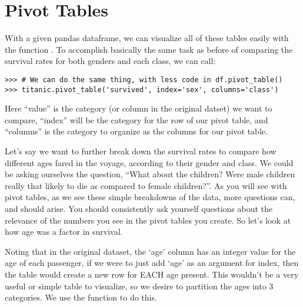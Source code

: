 \section*{Pivot Tables}
With a given pandas dataframe, we can visualize all of these tables easily with the function . To accomplish basically the same task as before of comparing the survival rates for both genders and each class, we can call:

\begin{lstlisting}
>>> # We can do the same thing, with less code in df.pivot_table()
>>> titanic.pivot_table('survived', index='sex', columns='class')
\end{lstlisting}


Here ``value'' is the category (or column in the original datset) we want to compare, ``index'' will be the category for the row of our pivot table, and ``columns'' is the category to organize as the columns for our pivot table.

Let's say we want to further break down the survival rates to compare how different ages fared in the voyage, according to their gender and class. We could be asking ourselves the question, ``What about the children? Were male children really that likely to die as compared to female children?''. As you will see with pivot tables, as we see these simple breakdowns of the data, more questions can, and should arise. You should consistently ask yourself questions about the relevance of the numbers you see in the pivot tables you create. So let's look at how age was a factor in survival.

Noting that in the original dataset, the `age' column has an integer value for the age of each passenger, if we were to just add `age' as an argument for index, then the table would create a new row for EACH age present. This wouldn't be a very useful or simple table to visualize, so we desire to partition the ages into 3 categories. We use the function  to do this.